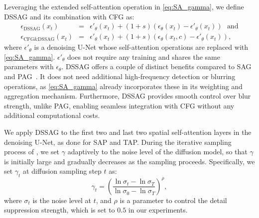 

Leveraging the extended self-attention operation in \cref{eq:SA_gamma}, we define DSSAG and its combination with CFG as:
\begin{eqnarray}
    \epsilon_\text{DSSAG}(x_t)\!\!\!\!\!\!&=&\!\!\!\!\!\! \epsilon'_\theta(x_t)+(1+s)\left(\epsilon_\theta(x_t)-\epsilon'_\theta(x_t)\right)~~~\text{and}\\
    \epsilon_\text{CFG\&DSSAG}(x_t)\!\!\!\!\!\! &=&\!\!\!\!\!\! \epsilon'_\theta(x_t)+(1+s)\left(\epsilon_\theta(x_t,c)-\epsilon'_\theta(x_t)\right),
    \label{eq:CFG_DSSAG}
\end{eqnarray}
where $\epsilon'_\theta$ is a denoising U-Net whose self-attention operations are replaced with \cref{eq:SA_gamma}.
$\epsilon'_\theta$ does not require any training and shares the same parameters with $\epsilon_\theta$.
DSSAG offers a couple of distinct benefits compared to SAG~\cite{sag} and PAG~\cite{pag}.
It does not need additional high-frequency detection or blurring operations, as \cref{eq:SA_gamma} already incorporates these in its weighting and aggregation mechanism.
Furthermore, DSSAG provides smooth control over blur strength, unlike PAG, enabling seamless integration with CFG without any additional computational costs.

We apply DSSAG to the first two and last two spatial self-attention layers in the denoising U-Net, as done for SAP and TAP.
During the iterative sampling process of \ours{}, we set $\gamma$ adaptively to the noise level of the diffusion model, so that $\gamma$ is initially large and gradually decreases as the sampling proceeds.
Specifically, we set $\gamma_t$ at diffusion sampling step $t$ as:
\begin{equation}
    \gamma_t = \left(\frac{\ln{\sigma_t}-\ln{\sigma_T}}{\ln{\sigma_0}-\ln{\sigma_T}}\right)^{\rho}, %
\end{equation}
where $\sigma_t$ is the noise level at $t$, and $\rho$ is a parameter to control the detail suppression strength, which is set to $0.5$ in our experiments.
